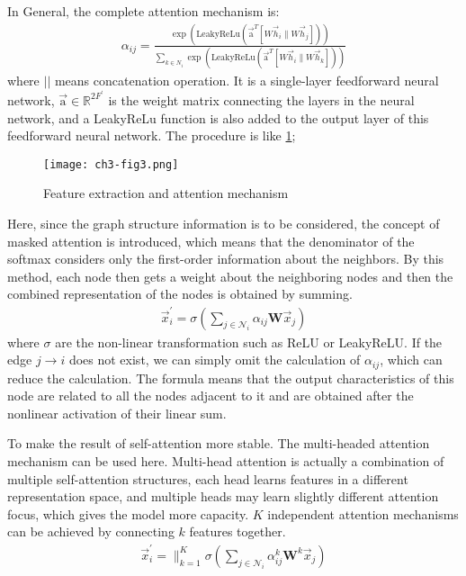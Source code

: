 In General, the complete attention mechanism is:
\begin{align}
	\alpha_{i j}=\frac{\exp (\text{LeakyReLu}(\overrightarrow{\mathrm{a}}^{T}[W \vec{h}_{i} \| W \vec{h}_{j}]))}{\sum_{k \in N_{i}} \exp (\text{LeakyReLu}(\overrightarrow{\mathrm{a}}^{T}[W \vec{h}_{i} \| W \vec{h}_{k}]))}
\end{align}
where \(||\) means concatenation operation. It is a single-layer feedforward neural network, \(\overrightarrow{\mathrm{a} } \in \mathbb{R}^{2F^{\prime}}\) is the weight matrix connecting the layers in the neural network, and a LeakyReLu function is also added to the output layer of this feedforward neural network. The procedure is like \figurename{\ref{fig:ch3-fig3}};

\begin{figure}[h]
	\centering
	\texttt{[image: ch3-fig3.png]}
	\caption{Feature extraction and attention mechanism}\label{fig:ch3-fig3}
\end{figure}

Here, since the graph structure information is to be considered, the concept of masked attention is introduced, which means that the denominator of the softmax considers only the first-order information about the neighbors. By this method, each node then gets a weight about the neighboring nodes and then the combined representation of the nodes is obtained by summing.
\begin{align}
	\vec{x}_{i}^{\prime}=\sigma(\sum_{j \in \mathcal{N}_{i}} \alpha_{i j} \mathbf{W} \vec{x}_{j})
\end{align}
where \(\sigma \) are the non-linear transformation such as ReLU or LeakyReLU. If the edge \(j \to i\) does not exist, we can simply omit the calculation of \(\alpha_{ij}\), which can reduce the calculation. The formula means that the output characteristics of this node are related to all the nodes adjacent to it and are obtained after the nonlinear activation of their linear sum.

To make the result of self-attention more stable. The multi-headed attention mechanism can be used here. Multi-head attention is actually a combination of multiple self-attention structures, each head learns features in a different representation space, and multiple heads may learn slightly different attention focus, which gives the model more capacity.
\(K\) independent attention mechanisms can be achieved by connecting \(k\) features together.
\begin{align}
	\vec{x}_{i}^{\prime}=\|_{k=1}^{K} \sigma(\sum_{j \in \mathcal{N}_{i}} \alpha_{i j}^{k} \mathbf{W}^{k} \vec{x}_{j})
\end{align}


